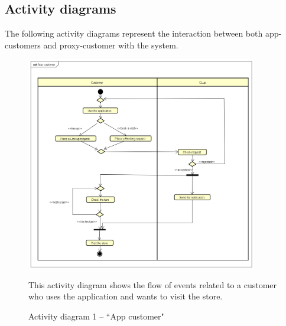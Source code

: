 \documentclass[a4paper,oneside,11pt]{book}   %
\newcommand{\captionrasd}[2]{\caption{#1}\par\begin{center}\vspace{-.01\textheight}\small#2.\end{center}}
\begin{document}
    \newpage
    \subsection{Activity diagrams}
    The following activity diagrams represent the interaction between both app-customers and proxy-customer with the system.
    
    \begin{figure}[H]
        \centering
        \includegraphics[width=0.9\textwidth, keepaspectratio]{pictures/activity_diagrams/app_customer}
        \captionrasd{Activity diagram 1 -- ``App customer"}{This activity diagram shows the flow of events related to a customer who uses the application and wants to visit the store}
        \label{figure:activity_diagram_1_app_customer}
    \end{figure}
    
\end{document}
